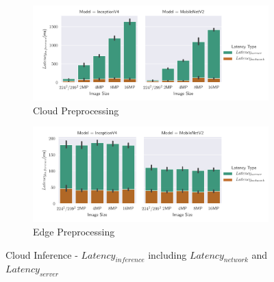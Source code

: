 \begin{figure}[!htb]
\centering
\begin{subfigure}[b]{0.95\textwidth}
   \includegraphics[width=1\linewidth]{./Bilder/single_plots/cloud_inference_plots/Cloud_Server_+_NetworkLatencies_cloudprepro.pdf}
   \caption{Cloud Preprocessing}
   \label{fig:CloudInferenceratioCloudtotal} 
\end{subfigure}

\begin{subfigure}[b]{0.95\textwidth}
   \includegraphics[width=1\linewidth]{./Bilder/single_plots/cloud_inference_plots/Cloud_Server_+_NetworkLatencies_edgeprepro.pdf}
   \caption{Edge Preprocessing}
   \label{fig:CloudInferenceRatioEdgetotal}
\end{subfigure}

\caption{Cloud Inference -  $Latency_{inference}$ including $Latency_{network}$ and $Latency_{server}$}
\end{figure}

